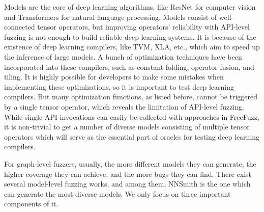 \begin{survey}
Models are the core of deep learning algorithms, like ResNet for computer vision and Transformers for natural language processing. Models consist of well-connected tensor operators, but improving operators' reliability with API-level fuzzing is not enough to build reliable deep learning systems. It is because of the existence of deep learning compilers, like TVM, XLA, etc., which aim to speed up the inference of large models. A bunch of optimization techniques have been incorporated into these compilers, such as constant folding, operator fusion, and tiling. It is highly possible for developers to make some mistakes when implementing these optimizations, so it is important to test deep learning compilers. But many optimization functions, as listed before, cannot be triggered by a single tensor operator, which reveals the limitation of API-level fuzzing. While single-API invocations can easily be collected with approaches in FreeFuzz, it is non-trivial to get a number of diverse models consisting of multiple tensor operators which will serve as the essential part of oracles for testing deep learning compilers.

For graph-level fuzzers, usually, the more different models they can generate, the higher coverage they can achieve, and the more bugs they can find. There exist several model-level fuzzing works, and among them, NNSmith is the one which can generate the most diverse models. We only focus on three important components of it.


\end{survey}
